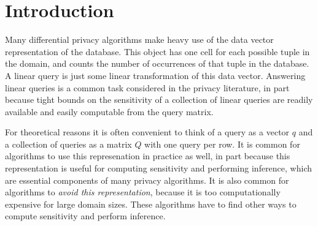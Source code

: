 \section{Introduction}

Many differential privacy algorithms make heavy use of the data vector representation of the database.  This object has one cell for each possible tuple in the domain, and counts the number of occurrences of that tuple in the database.  A linear query is just some linear transformation of this data vector.  Answering linear queries is a common task considered in the privacy literature, in part because tight bounds on the sensitivity of a collection of linear queries are readily available and easily computable from the query matrix.  

For theoretical reasons it is often convenient to think of a query as a vector $q$ and a collection of queries as a matrix $Q$ with one query per row.  It is common for algorithms to use this represenation in practice as well, in part because this representation is useful for computing sensitivity and performing inference, which are essential components of many privacy algorithms.  It is also common for algorithms to \emph{avoid this representation}, because it is too computationally expensive for large domain sizes.  These algorithms have to find other ways to compute sensitivity and perform inference.

